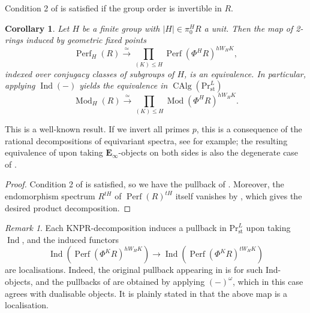 \documentclass[11pt, a4paper]{article}
\newcommand{\st}{\mathrm{st}}
\newcommand{\1}{\mathbf{1}}
\DeclareMathOperator{\CAlg}{CAlg}
\newcommand{\PrLst}{{\mathrm{Pr}^L_\st}}
\DeclareMathOperator{\Ind}{Ind}
\DeclareMathOperator{\Mod}{Mod}
\DeclareMathOperator{\Perf}{Perf}
\newcommand{\E}{\mathbf{E}}
\theoremstyle{plain}
\newtheorem{cor}[equation]{Corollary}
\theoremstyle{definition}
\theoremstyle{remark}\numberwithin{equation}{section}
\newtheorem{remark}[equation]{Remark}
\begin{document}
Condition 2 of  is satisfied if the group order is invertible in $R$.

\begin{cor}\label{pr:rationality_decomposition}
    Let $H$ be a finite group with $|H| \in \pi_0^H R$ a unit. Then the map of 2-rings induced by geometric fixed points
    \[\Perf_H(R) \xrightarrow{\simeq} \prod_{(K)\leq H} \Perf(\Phi^H R)^{hW_H K},\]
    indexed over conjugacy classes of subgroups of $H$, is an equivalence. In particular, applying $\Ind(-)$ yields the equivalence in $\CAlg(\PrLst)$
    \[\Mod_H(R) \xrightarrow{\simeq} \prod_{(K) \leq H} \Mod(\Phi^H R)^{hW_H K}.\]
\end{cor}

This is a well-known result. If we invert all primes $p$, this is a consequence of the rational decompositions of equivariant spectra, see \cite[Thm.13.1]{david_magdalena_rationalmodels} for example; the resulting equivalence of upon taking $\E_\infty$-objects on both sides is also the degenerate case of \cite[Th.6.7]{algebraic_model_ucom_BDL}.

\begin{proof}
    Condition 2 of  is satisfied, so we have the pullback of . Moreover, the endomorphism spectrum $R^{tH}$ of $\Perf(R)^{tH}$ itself vanishes by , which gives the desired product decomposition.
\end{proof}

\begin{remark}\label{rmk:excisionsquares}
    Each KNPR-decomposition induces a pullback in $\PrLst$ upon taking $\Ind$, and the induced functors
    \[\Ind(\Perf(\Phi^K R)^{hW_H K}) \to \Ind(\Perf(\Phi^K R)^{tW_H K})\]
    are localisations. Indeed, the original pullback appearing in \cite[Thm.7.11]{NPR2024} is for such Ind-objects, and the pullbacks of  are obtained by applying $(-)^\omega$, which in this case agrees with dualisable objects. It is plainly stated in \cite[Thm.7.11]{NPR2024} that the above map is a localisation.
\end{remark}
\end{document}
